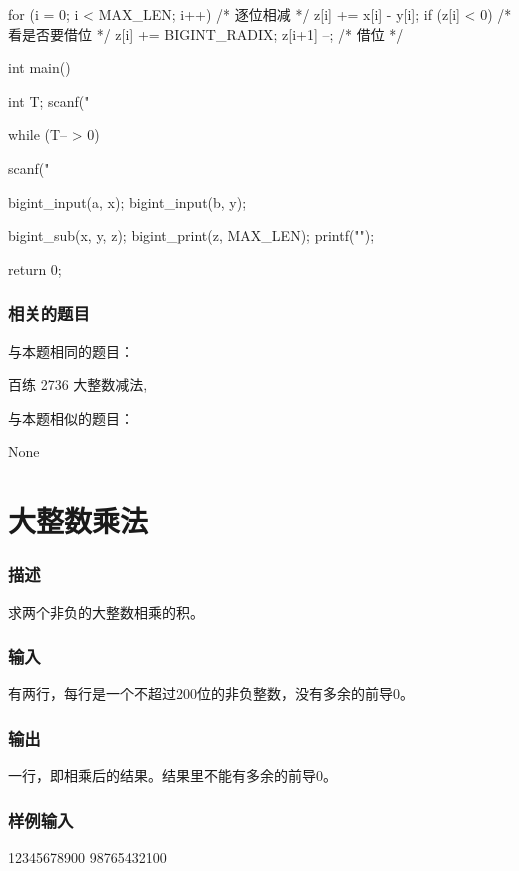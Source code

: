 \begin{Codex}[label=bigint_sub.c]
{    for (i = 0; i < MAX_LEN; i++) {  /* 逐位相减 */
        z[i] += x[i] - y[i];
        if (z[i] < 0) {  /* 看是否要借位 */
            z[i] += BIGINT_RADIX;
            z[i+1] --;  /* 借位 */
        }
    }
}

int main() {
    int T;    
    scanf("%

    while (T-- > 0) {
        scanf("%

        bigint_input(a, x);
        bigint_input(b, y);

        bigint_sub(x, y, z);
        bigint_print(z, MAX_LEN);
        printf("\n"); 
    }
    return 0;
}
\end{Codex}

\subsubsection{相关的题目}
与本题相同的题目：
\begindot
\item 百练 2736 大整数减法, 
\myenddot

与本题相似的题目：
\begindot
\item  None
\myenddot


\section{大整数乘法} %
\label{sec:bigintmul}
\subsubsection{描述}
求两个非负的大整数相乘的积。

\subsubsection{输入}
有两行，每行是一个不超过200位的非负整数，没有多余的前导0。 

\subsubsection{输出}
一行，即相乘后的结果。结果里不能有多余的前导0。 

\subsubsection{样例输入}
\begin{Code}
12345678900
98765432100
\end{Code}

